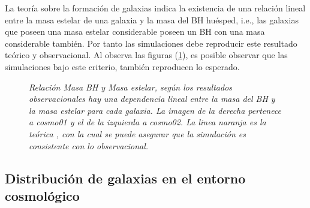 La teoría sobre la formación de galaxias indica la existencia de una relación lineal entre la masa estelar de una galaxia y la masa del BH huésped, i.e., las galaxias que poseen una masa estelar considerable poseen un BH con una masa considerable también. Por tanto las simulaciones debe reproducir este resultado teórico y observacional. Al observa las figuras (\ref{fig: Mass_bhVsMass_stelar}), es posible observar que las simulaciones bajo este criterio, también reproducen lo esperado. 
%
 \begin{figure}
 \centering
 \caption{\emph{Relación Masa BH y Masa estelar, según los resultados observacionales hay una dependencia lineal entre la masa del BH y la masa estelar para cada galaxia. La imagen de la derecha pertenece a {\it{cosmo01}} y el de la izquierda a {\it{cosmo02}}. La linea naranja es la teórica \cite{McConnell2013}, con la cual se puede asegurar que la simulación es consistente con lo observacional.}}
 \label{fig: Mass_bhVsMass_stelar}
\end{figure}
%
    \subsection{ Distribución de galaxias en el entorno cosmológico}
    \label{subsec: Distribucion de galaxias}


